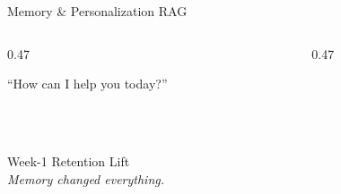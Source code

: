 \begin{frame}{Memory \& Personalization RAG}
\begin{columns}[T]
  \begin{column}{0.47\textwidth}
    \begin{highlightbox}
      \footnotesize\centering
      {\color{gray}``How can I help you today?''}\\[0.3em]
    \end{highlightbox}
  \end{column}
  \begin{column}{0.47\textwidth}
    \begin{keybox}
      \footnotesize\centering
      \\
      \\[0.3em]
    \end{keybox}
  \end{column}
\end{columns}
\vspace{1em}
\begin{center}
  {\fontsize{40}{46}\selectfont{}}\\[0.3em]
  {\normalsize Week-1 Retention Lift}\\[0.5em]
  {\small\itshape Memory changed everything.}
\end{center}
\end{frame}

